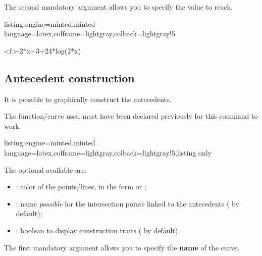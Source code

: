 \documentclass[11pt,a4paper]{ltxdoc}
\begin{document}
\smallskip

The second mandatory argument allows you to specify the value to reach.

\begin{tcblisting}{listing engine=minted,minted language=latex,colframe=lightgray,colback=lightgray!5}
\begin{GraphTikz}%
	[x=0.9cm,y=0.425cm,Xmin=4,Xmax=20,Origx=4,
	Ymin=40,Ymax=56,Ygrid=2,Ygrids=1,Origy=40]
	{-2*x+3+24*log(2*x)}
\end{GraphTikz}
\end{tcblisting}

\pagebreak

\subsection{Antecedent construction}\label{tracanteced}

It is possible to graphically construct the antecedents.

The function/curve used must have been declared previously for this command to work.

\begin{tcblisting}{listing engine=minted,minted language=latex,colframe=lightgray,colback=lightgray!5,listing only}
\end{tcblisting}

The optional \MontreCode{[keys]} available are:

\smallskip

\begin{itemize}
	\item {}: color of the points/lines, in the form  or ;
	\item {}: name \textit{possible} for the intersection points linked to the antecedents ( by default);
	\item {}: boolean to display construction traits ( by default).
\end{itemize}

\smallskip

The first mandatory argument allows you to specify the \textbf{name} of the curve.
\end{document}
